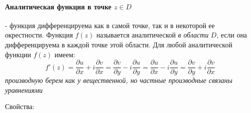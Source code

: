 \documentclass[12pt]{extarticle}
\begin{document}
\paragraph{Аналитическая функция в точке $z\in D$} -
функция дифференцируема как в самой точке, так и в некоторой ее
окрестности. Функция $f(z)$ называется аналитической \textit{в
области} $D$, если она дифференцируема в каждой точке этой области.
Для любой аналитической функции $f(z)$ имеем:
\begin{displaymath}
    f'(z)
    =\frac{\partial u}{\partial x}+i\frac{\partial v}{\partial x}
    =\frac{\partial v}{\partial y}-i\frac{\partial u}{\partial y}
    =\frac{\partial u}{\partial x}-i\frac{\partial u}{\partial y}
    =\frac{\partial v}{\partial y}+i\frac{\partial v}{\partial x}
\end{displaymath}
\textit{производную берем как у вещественной, но частные производные
связаны уравнениями}
\par Свойства:
\end{document}
